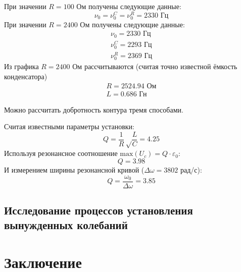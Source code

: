 При значении $R=100$ Ом получены следующие данные:
\begin{equation}
	\nu_0=\nu_0^C=\nu_0^R=2330 \text{ Гц}
\end{equation}
При значении $R=2400$ Ом получены следующие данные:
\begin{gather}
	\nu_0=2330 \text{ Гц}\\
	\nu_0^C=2293 \text{ Гц}\\
	\nu_0^R=2369 \text{ Гц}
\end{gather}
Из графика $R=2400$ Ом рассчитываются (считая точно известной ёмкость конденсатора)
\begin{gather}
	R=2524.94 \text{ Ом}\\
	L=0.686 \text{ Гн}
\end{gather}

Можно рассчитать добротность контура тремя способами.

Считая известными параметры установки:
\begin{equation}
	Q=\frac{1}{R}\sqrt\frac{L}{C}=4.25
\end{equation}
Используя резонансное соотношение $\mathrm{max}(U_c)=Q\cdot \varepsilon_0$:
\begin{equation}
	Q=3.98
\end{equation}
И измерением ширины резонансной кривой ($\Delta\omega=3802$ рад/с):
\begin{equation}
	Q=\frac{\omega_0}{\Delta\omega}=3.85
\end{equation}
\subsection{Исследование процессов установления вынужденных колебаний}
\section{Заключение}

 